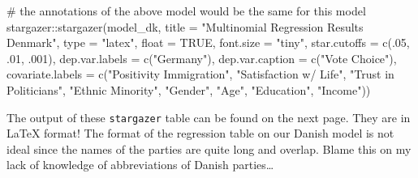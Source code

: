 \documentclass[
  letterpaper,
  DIV=11,
  numbers=noendperiod]{scrreprt}
\newenvironment{Shaded}{\begin{snugshade}}{\end{snugshade}}
\newcommand{\AttributeTok}[1]{\textcolor[rgb]{0.40,0.45,0.13}{#1}}
\newcommand{\CommentTok}[1]{\textcolor[rgb]{0.37,0.37,0.37}{#1}}
\newcommand{\ConstantTok}[1]{\textcolor[rgb]{0.56,0.35,0.01}{#1}}
\newcommand{\DecValTok}[1]{\textcolor[rgb]{0.68,0.00,0.00}{#1}}
\newcommand{\FunctionTok}[1]{\textcolor[rgb]{0.28,0.35,0.67}{#1}}
\newcommand{\NormalTok}[1]{\textcolor[rgb]{0.00,0.23,0.31}{#1}}
\newcommand{\SpecialCharTok}[1]{\textcolor[rgb]{0.37,0.37,0.37}{#1}}
\newcommand{\StringTok}[1]{\textcolor[rgb]{0.13,0.47,0.30}{#1}}
\begin{document}
\begin{Shaded}
\begin{Highlighting}[]
\CommentTok{\# the annotations of the above model would be the same for this model}
\NormalTok{stargazer}\SpecialCharTok{::}\FunctionTok{stargazer}\NormalTok{(model\_dk,}
                     \AttributeTok{title =} \StringTok{"Multinomial Regression Results Denmark"}\NormalTok{,}
                     \AttributeTok{type =} \StringTok{"latex"}\NormalTok{,}
                     \AttributeTok{float =} \ConstantTok{TRUE}\NormalTok{,}
                     \AttributeTok{font.size =} \StringTok{"tiny"}\NormalTok{, }
                     \AttributeTok{star.cutoffs =} \FunctionTok{c}\NormalTok{(.}\DecValTok{05}\NormalTok{, .}\DecValTok{01}\NormalTok{, .}\DecValTok{001}\NormalTok{), }
                     \AttributeTok{dep.var.labels =} \FunctionTok{c}\NormalTok{(}\StringTok{"Germany"}\NormalTok{),}
                     \AttributeTok{dep.var.caption =} \FunctionTok{c}\NormalTok{(}\StringTok{"Vote Choice"}\NormalTok{),}
                     \AttributeTok{covariate.labels =} \FunctionTok{c}\NormalTok{(}\StringTok{"Positivity Immigration"}\NormalTok{,}
                             \StringTok{"Satisfaction w/ Life"}\NormalTok{, }\StringTok{"Trust in Politicians"}\NormalTok{,}
                             \StringTok{"Ethnic Minority"}\NormalTok{, }\StringTok{"Gender"}\NormalTok{, }\StringTok{"Age"}\NormalTok{, }\StringTok{"Education"}\NormalTok{, }
                             \StringTok{"Income"}\NormalTok{))}
\end{Highlighting}
\end{Shaded}

The output of these \texttt{stargazer} table can be found on the next
page. They are in LaTeX format! The format of the regression table on
our Danish model is not ideal since the names of the parties are quite
long and overlap. Blame this on my lack of knowledge of abbreviations of
Danish parties\ldots{}
\end{document}

